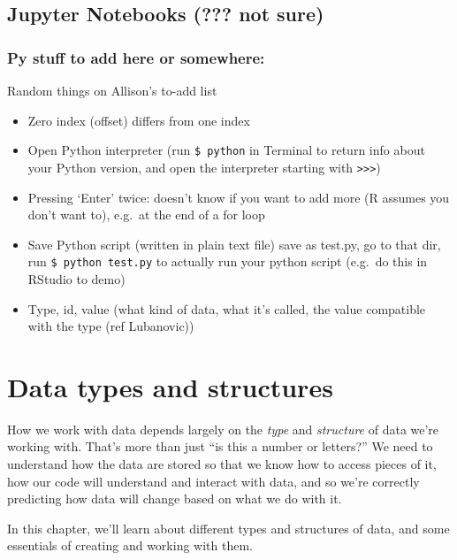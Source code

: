 \documentclass[
]{book}
\providecommand{\tightlist}{%
  \setlength{\itemsep}{0pt}\setlength{\parskip}{0pt}}
\begin{document}
\hypertarget{jupyter-notebooks-not-sure}{%
\section{Jupyter Notebooks (??? not sure)}\label{jupyter-notebooks-not-sure}}

\hypertarget{py-stuff-to-add-here-or-somewhere}{%
\subsection{Py stuff to add here or somewhere:}\label{py-stuff-to-add-here-or-somewhere}}

Random things on Allison's to-add list

\begin{itemize}
\tightlist
\item
  Zero index (offset) differs from one index
\item
  Open Python interpreter (run \texttt{\$\ python} in Terminal to return info about your Python version, and open the interpreter starting with \texttt{\textgreater{}\textgreater{}\textgreater{}})
\item
  Pressing `Enter' twice: doesn't know if you want to add more (R assumes you don't want to), e.g.~at the end of a for loop
\item
  Save Python script (written in plain text file) save as test.py, go to that dir, run \texttt{\$\ python\ test.py} to actually run your python script (e.g.~do this in RStudio to demo)
\item
  Type, id, value (what kind of data, what it's called, the value compatible with the type (ref Lubanovic))
\end{itemize}

\hypertarget{types}{%
\chapter{Data types and structures}\label{types}}

How we work with data depends largely on the \emph{type} and \emph{structure} of data we're working with. That's more than just ``is this a number or letters?'' We need to understand how the data are stored so that we know how to access pieces of it, how our code will understand and interact with data, and so we're correctly predicting how data will change based on what we do with it.

In this chapter, we'll learn about different types and structures of data, and some essentials of creating and working with them.
\end{document}
